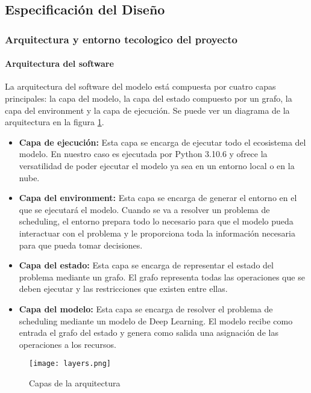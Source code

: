 \subsection{Especificación del Diseño}
\subsubsection{Arquitectura y entorno tecologico del proyecto}
\paragraph{Arquitectura del software}
La arquitectura del software del modelo está compuesta por cuatro capas principales: 
la capa del modelo, la capa del estado compuesto por un grafo, la capa del 
environment y la capa de ejecución. Se puede ver un diagrama de la arquitectura en la
figura \ref{fig:layers}. \medskip

\begin{itemize}
    \item \textbf{Capa de ejecución:} Esta capa se encarga de ejecutar todo el ecosistema
    del modelo. En nuestro caso es ejecutada por Python 3.10.6\cite{C8d} y ofrece la versatilidad de
    poder ejecutar el modelo ya sea en un entorno local o en la nube. 
    \item \textbf{Capa del environment:} Esta capa se encarga de generar el entorno en el que se
    ejecutará el modelo. Cuando se va a resolver un problema de scheduling, el entorno
    prepara todo lo necesario para que el modelo pueda interactuar con el problema y le
    proporciona toda la información necesaria para que pueda tomar decisiones.
    \item \textbf{Capa del estado:} Esta capa se encarga de representar el estado del problema
    mediante un grafo. El grafo representa todas las operaciones que se deben ejecutar y
    las restricciones que existen entre ellas.
    \item \textbf{Capa del modelo:} Esta capa se encarga de resolver el problema de scheduling
    mediante un modelo de Deep Learning. El modelo recibe como entrada el grafo del
    estado y genera como salida una asignación de las operaciones a los recursos. 
\end{itemize}

\begin{figure}[ht]
    \centering
    \texttt{[image: layers.png]}
    \caption{Capas de la arquitectura}
    \label{fig:layers}
\end{figure}


